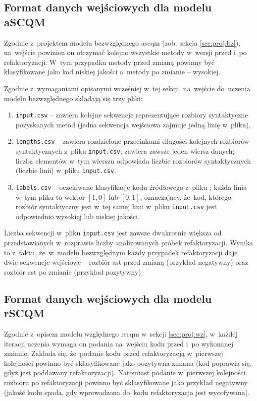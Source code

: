 \documentclass[twoside]{praca}
\begin{document}
\subsection{Format danych wejściowych dla modelu aSCQM}
\label{sec:impl:input-ascqm}
Zgodnie z~projektem modelu bezwzględnego \gls{ascqm} (zob. sekcja \ref{sec:proj:bz}), na~wejście powinien on otrzymać kolejno wszystkie metody w~wersji przed i~po refaktoryzacji. W~tym przypadku metody przed zmianą powinny być klasyfikowane jako kod niskiej jakości a~metody po zmianie -- wysokiej.

Zgodnie z~wymaganiami opisanymi wcześniej w~tej sekcji, na~wejście do~uczenia modelu bezwzględnego składają się trzy pliki:

\begin{enumerate}
\item \texttt{input.csv} -- zawiera kolejne sekwencje reprezentujące rozbiory syntaktyczne pozyskanych metod (jedna sekwencja wejściowa zajmuje jedną linię w~pliku),
\item \texttt{lengths.csv} -- zawiera rozdzielone przecinkami długości kolejnych rozbiorów syntaktycznych z~pliku \texttt{input.csv}; zawiera zawsze jeden wiersz danych; liczba elementów w~tym wierszu odpowiada liczbie rozbiorów syntaktycznych (liczbie linii) w~pliku \texttt{input.csv},
\item \texttt{labels.csv} -- oczekiwane klasyfikacje kodu źródłowego z~pliku ; każda linia w~tym pliku to wektor $[1,0]$ lub $[0,1]$, oznaczający, że~kod, którego rozbiór syntaktyczny jest w~tej samej linii w~pliku \texttt{input.csv} jest odpowiednio wysokiej lub niskiej jakości.
\end{enumerate}

Liczba sekwencji w~pliku \texttt{input.csv} jest zawsze dwukrotnie większa od przedstawianych w~rozprawie liczby analizowanych próbek refaktoryzacji. Wynika to z~faktu, że~w~modelu bezwzględnym każdy przypadek refaktoryzacji daje dwie sekwencje wejściowe -- rozbiór \gls{ast} przed zmianą (przykład negatywny) oraz rozbiór \gls{ast} po zmianie (przykład pozytywny).

\subsection{Format danych wejściowych dla modelu rSCQM}
\label{sec:impl:input-rscqm}

Zgodnie z~opisem modelu względnego \gls{rscqm} w~sekcji \ref{sec:proj:wz}, w~każdej iteracji uczenia wymaga on podania na~wejściu kodu przed i~po wykonanej zmianie. Zakłada się, że~podanie kodu przed refaktoryzacją w~pierwszej kolejności powinno być sklasyfikowane jako pozytywna zmiana (kod poprawia się, gdyż jest poddawany refaktoryzacji). Natomiast podanie w~pierwszej kolejności rozbioru po refaktoryzacji powinno być sklasyfikowane jako przykład negatywny (jakość kodu spada, gdy wprowadzona do~kodu refaktoryzacja jest wycofywana).
\end{document}

